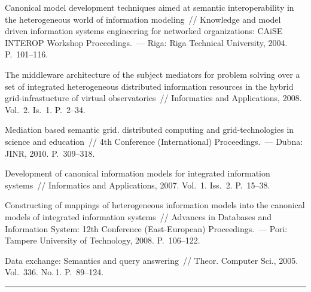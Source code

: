 \begin{multicols}{2}
{{\begin{thebibliography}{9}
Canonical model development techniques aimed at semantic interoperability in the heterogeneous 
world of information modeling~// Knowledge and model driven information systems engineering 
for networked organizations: CAiSE INTEROP Workshop Proceedings.~--- Riga: Riga Technical 
University, 2004.  P.~101--116.


The middleware architecture of the subject mediators for problem solving over a set of 
integrated 
heterogeneous distributed information resources in the hybrid grid-infrastucture of virtual 
observatories~// Informatics and Applications, 2008.  Vol.~2. Is.~1. P.~2--34.

Mediation based semantic grid. distributed computing and grid-technologies in science and 
education~// 4th  Conference (International) Proceedings.~--- Dubna: JINR, 2010.  P.~309--318.

Development of canonical information models for integrated information systems~// Informatics 
and Applications, 2007.  Vol.~1. Iss.~2. P.~15--38.

Constructing of mappings of heterogeneous information models into the canonical models of 
integrated information systems~// Advances in Databases and Information System:  
12th  Conference (East-European) Proceedings.~--- Pori: Tampere University of Technology, 2008.  P.~106--122.

Data exchange: Semantics and query answering~// Theor. Computer Sci., 2005.  Vol.~336. 
No.\,1. P.~89--124.

 \end{thebibliography}
}
}


\end{multicols}

\vspace*{6pt}

\hrule

\vspace*{12pt}


\def\tit{РАЗВИТИЕ ТЕХНОЛОГИЙ ИНТЕГРАЦИИ ИНФОРМАЦИИ 
ДЛЯ~РЕШЕНИЯ ЗАДАЧ НАД~НЕОДНОРОДНЫМИ 
ИНФОРМАЦИОННЫМИ РЕСУРСАМИ}

